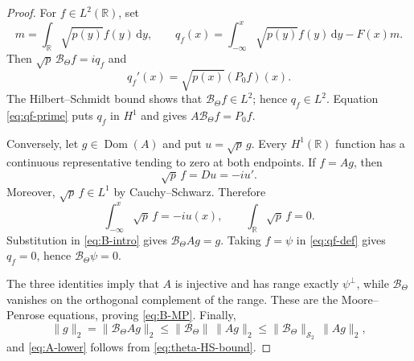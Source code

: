 \documentclass[11pt,reqno]{amsart}
\numberwithin{equation}{section}
\newcommand{\R}{\mathbb R}
\newcommand{\1}{\mathbf 1}
\newcommand{\HS}{\mathcal S_2}
\newcommand{\BTheta}{\mathcal B_{\Theta}}
\newcommand{\Dom}{\operatorname{Dom}}
\newcommand{\dd}{\,\mathrm d}
\begin{document}
\begin{proof}
For $f\in L^2(\R)$, set
\begin{equation}\label{eq:qf-def}
 m=\int_{\R}\sqrt{p(y)}f(y)\dd y,
 \qquad
 q_f(x)=\int_{-\infty}^x\sqrt{p(y)}f(y)\dd y-F(x)m.
\end{equation}
Then $\sqrt p\,\BTheta f=iq_f$ and
\begin{equation}\label{eq:qf-prime}
 q_f'(x)=\sqrt{p(x)}(P_0f)(x).
\end{equation}
The Hilbert--Schmidt bound shows that $\BTheta f\in L^2$; hence
$q_f\in L^2$.  Equation \eqref{eq:qf-prime} puts $q_f$ in $H^1$ and gives
$A\BTheta f=P_0f$.

Conversely, let $g\in\Dom(A)$ and put $u=\sqrt p\,g$.  Every $H^1(\R)$
function has a continuous representative tending to zero at both endpoints.
If $f=Ag$, then
\begin{equation}\label{eq:Du-f}
 \sqrt p\,f=Du=-iu'.
\end{equation}
Moreover, $\sqrt p\,f\in L^1$ by Cauchy--Schwarz.  Therefore
\begin{equation}\label{eq:integrate-Du}
 \int_{-\infty}^x\sqrt p\,f=-iu(x),
 \qquad
 \int_{\R}\sqrt p\,f=0.
\end{equation}
Substitution in \eqref{eq:B-intro} gives $\BTheta Ag=g$.  Taking
$f=\psi$ in \eqref{eq:qf-def} gives $q_f=0$, hence
$\BTheta\psi=0$.

The three identities imply that $A$ is injective and has range exactly
$\psi^\perp$, while $\BTheta$ vanishes on the orthogonal complement of the
range.  These are the Moore--Penrose equations, proving
\eqref{eq:B-MP}.  Finally,
\[
 \|g\|_2=\|\BTheta Ag\|_2
 \leq\|\BTheta\|\,\|Ag\|_2
 \leq\|\BTheta\|_{\HS}\,\|Ag\|_2,
\]
and \eqref{eq:A-lower} follows from \eqref{eq:theta-HS-bound}.
\end{proof}
\end{document}

